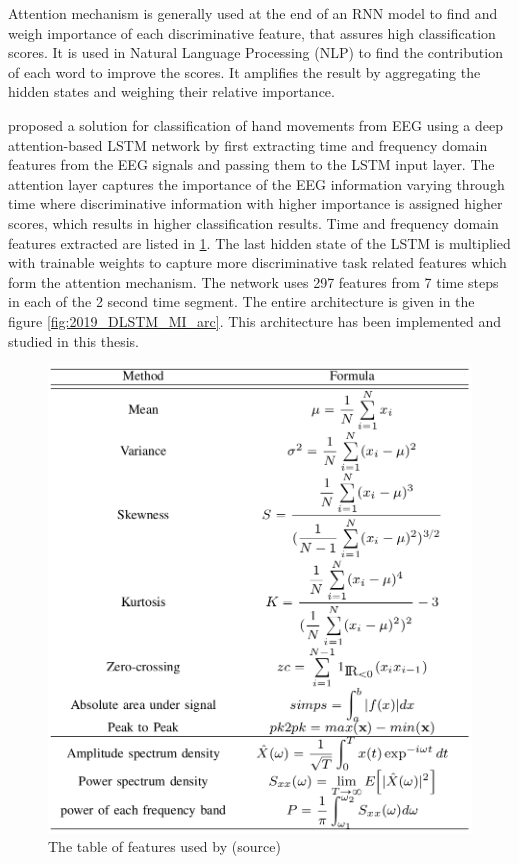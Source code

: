 Attention mechanism is generally used at the end of an RNN model to find and weigh importance of each discriminative feature, that assures high classification scores. It is used in Natural Language Processing (NLP) \cite{2018_DL_LSTM} to find the contribution of each word to improve the scores. It amplifies the result by aggregating the hidden states and weighing their relative importance. 

\cite{2019_DLSTM_MI} proposed a solution for classification of hand movements from EEG using a deep attention-based LSTM network by first extracting time and frequency domain features from the EEG signals and passing them to the LSTM input layer. The attention layer captures the importance of the EEG information varying through time where discriminative information with higher importance is assigned higher scores, which results in higher classification results. Time and frequency domain features extracted are listed in \ref{fig:2019_DLSTM_MI_Table2}. The last hidden state of the LSTM is multiplied with trainable weights to capture more discriminative task related features which form the attention mechanism. The network uses 297 features from 7 time steps in each of the 2 second time segment. The entire architecture is given in the figure \ref{fig:2019_DLSTM_MI_arc}. This architecture has been implemented and studied in this thesis.

    \begin{figure}[H] 
    \begin{center}
        \includegraphics[height=0.6\textwidth]{images/2019_DLSTM_MI_Table2.png}
        \caption{The table of features used by \cite{2019_DLSTM_MI}(source)}
        \label{fig:2019_DLSTM_MI_Table2}
    \end{center}
    \end{figure}

